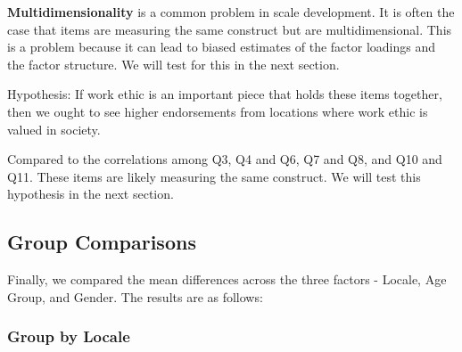 \documentclass[
  letterpaper,
  DIV=11,
  numbers=noendperiod]{scrartcl}
\begin{document}
\begin{tcolorbox}[enhanced jigsaw, colbacktitle=quarto-callout-tip-color!10!white, left=2mm, breakable, rightrule=.15mm, colframe=quarto-callout-tip-color-frame, opacitybacktitle=0.6, titlerule=0mm, bottomrule=.15mm, toprule=.15mm, coltitle=black, toptitle=1mm, colback=white, opacityback=0, bottomtitle=1mm, title=\textcolor{quarto-callout-tip-color}{\faLightbulb}\hspace{0.5em}{Tip}, arc=.35mm, leftrule=.75mm]

\textbf{Multidimensionality} is a common problem in scale development.
It is often the case that items are measuring the same construct but are
multidimensional. This is a problem because it can lead to biased
estimates of the factor loadings and the factor structure. We will test
for this in the next section.

Hypothesis: If work ethic is an important piece that holds these items
together, then we ought to see higher endorsements from locations where
work ethic is valued in society.

\end{tcolorbox}

Compared to the correlations among Q3, Q4 and Q6, Q7 and Q8, and Q10 and
Q11. These items are likely measuring the same construct. We will test
this hypothesis in the next section.

\subsection{Group Comparisons}\label{group-comparisons}

Finally, we compared the mean differences across the three factors -
Locale, Age Group, and Gender. The results are as follows:

\subsubsection{Group by Locale}\label{group-by-locale}
\end{document}
